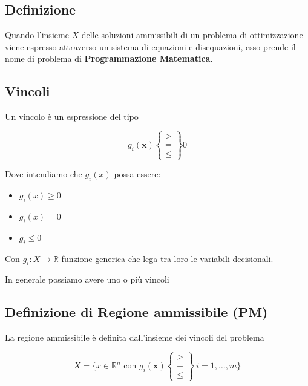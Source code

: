 \subsection{Definizione}
Quando l'insieme $X$ delle soluzioni ammissibili di un problema di ottimizzazione \uline{viene espresso attraverso un sistema di equazioni e disequazioni}, esso prende il nome di problema di \textbf{Programmazione Matematica}.

\subsection{Vincoli}
Un vincolo è un espressione del tipo


\begin{minipage}[c]{0.4\textwidth}
    {
    \large
    $$
        g_i(\mathbf{x})
        \left\{
        \begin{matrix}
        \geq \\
        = \\
        \leq
        \end{matrix}
        \right\}
        0
    $$
}
\end{minipage}
\hfil
\begin{minipage}[c]{0.4\textwidth}
    Dove intendiamo che $g_i(x)$ possa essere:
    \begin{itemize}
        \item $g_i(x) \geq 0$
        \item $g_i(x) = 0$
        \item $g_i \leq 0$
    \end{itemize}
\end{minipage}

Con $g_i:X \to \mathbb{R}$ funzione generica che lega tra loro le variabili decisionali.

In generale possiamo avere uno o più vincoli

\subsection{Definizione di Regione ammissibile (PM)}
La regione ammissibile è definita dall'insieme dei vincoli del problema

{
    \large
    $$
        X = \{x \in \mathbb{R}^n \text{ con } g_i(\mathbf{x})
        \left\{
        \begin{matrix}
        \geq \\
        = \\
        \leq
        \end{matrix}
        \right\}
        \ i=1,\dots,m
        \}   
    $$
}

